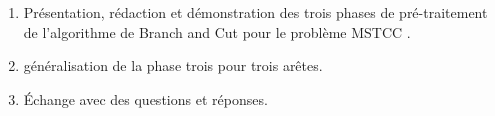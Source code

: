 \begin{enumerate}
    \item Présentation, rédaction et démonstration des trois phases de pré-traitement de l'algorithme de Branch and Cut pour le problème MSTCC .
    \item généralisation de la phase trois pour trois arêtes.
    \item Échange avec des questions et réponses.
    

\end{enumerate}
